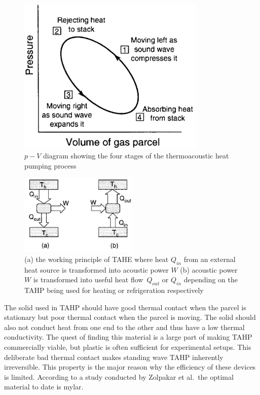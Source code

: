 \documentclass[a4paper]{article}
\newcommand{\newpara}
    {
      \bigbreak{}
      \noindent
    }
\begin{document}
\begin{figure}[ht]
  \centering
  \includegraphics[width=0.8\textwidth]{images/pvstanding.png}
  \caption{\(p-V\) diagram showing the four stages of the thermoacoustic heat pumping process\cite{russell2002tabletop}}\label{pvstanding}
\end{figure}
\begin{figure}[ht]
  \centering
  \includegraphics[width=0.5\textwidth]{images/diagramengine.png}
  \caption{(a) the working principle of TAHE where heat \(Q_{in}\) from an external heat source is transformed into acoustic power \(W\) (b) acoustic power \(W\) is transformed into useful heat flow~\(Q_{out}\) or \(Q_{in}\) depending on the TAHP being used for heating or refrigeration respectively\cite{russell2002tabletop}}\label{diagramengine}
\end{figure}
\newpara{}
The solid used in TAHP should have good thermal contact when the parcel is stationary but poor thermal contact when the parcel is moving. The solid should also not conduct heat from one end to the other and thus have a low thermal conductivity.  The quest of finding this material is a large part of making TAHP commercially viable, but plastic is often sufficient for experimental setups. This deliberate bad thermal contact makes standing wave TAHP inherently irreversible. This property is the major reason why the efficiency of these devices is limited. According to a study conducted by Zolpakar et al.\ the optimal material to date is mylar\cite{ZOLPAKAR2016626}.
\end{document}
